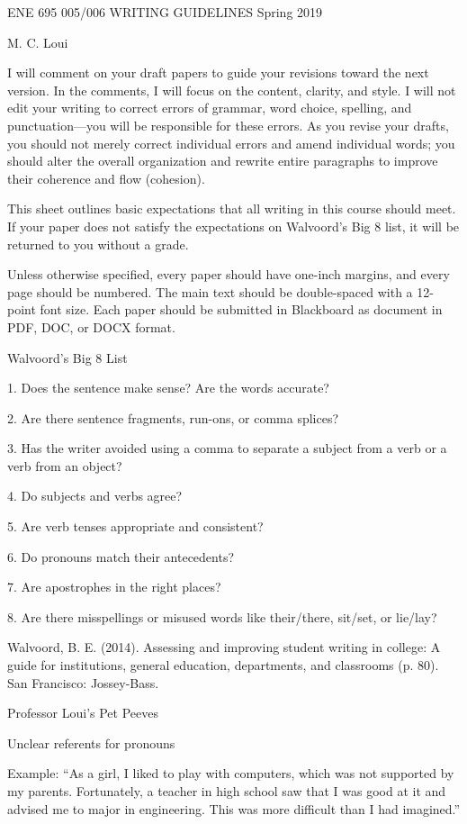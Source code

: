ENE 695 005/006 WRITING GUIDELINES Spring 2019

M. C. Loui

I will comment on your draft papers to guide your revisions toward the next version. In the comments, I will focus on the content, clarity, and style. I will not edit your writing to correct errors of grammar, word choice, spelling, and punctuation—you will be responsible for these errors. As you revise your drafts, you should not merely correct individual errors and amend individual words; you should alter the overall organization and rewrite entire paragraphs to improve their coherence and flow (cohesion).

This sheet outlines basic expectations that all writing in this course should meet. If your paper does not satisfy the expectations on Walvoord’s Big 8 list, it will be returned to you without a grade.

Unless otherwise specified, every paper should have one-inch margins, and every page should be numbered. The main text should be double-spaced with a 12-point font size. Each paper should be submitted in Blackboard as document in PDF, DOC, or DOCX format.

Walvoord’s Big 8 List

1. Does the sentence make sense? Are the words accurate?

2. Are there sentence fragments, run-ons, or comma splices?

3. Has the writer avoided using a comma to separate a subject from a verb or a verb from an object?

4. Do subjects and verbs agree?

5. Are verb tenses appropriate and consistent?

6. Do pronouns match their antecedents?

7. Are apostrophes in the right places?

8. Are there misspellings or misused words like their/there, sit/set, or lie/lay?

Walvoord, B. E. (2014). Assessing and improving student writing in college: A guide for institutions, general education, departments, and classrooms (p. 80). San Francisco: Jossey-Bass.

Professor Loui’s Pet Peeves

Unclear referents for pronouns

Example: “As a girl, I liked to play with computers, which was not supported by my parents. Fortunately, a teacher in high school saw that I was good at it and advised me to major in engineering. This was more difficult than I had imagined.”

